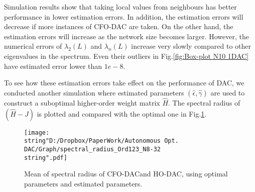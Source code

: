 \begin{figure*}
\hfill{}\hfill{}\hfill{}

\hfill{}\hfill{}\hfill{}

\caption{\label{fig:Box-plot N10 1DAC}Box plot of log mean estimation error
of eigenvalues, with/without local value of neighbors. Note that excluding
local values of neighbors will create more outliers as well as increase
the estimation error.}
\end{figure*}


Simulation results show that taking local values from neighbours has
better performance in lower estimation errors. In addition, the estimation
errors will decrease if more instances of CFO-DAC are taken. On the
other hand, the estimation errors  will increase as the network size
becomes larger. However, the numerical errors of $\lambda_{2}\left(L\right)$
and $\lambda_{n}\left(L\right)$ increase very slowly compared to
other eigenvalues in the spectrum. Even their outliers in Fig.\ref{fig:Box-plot N10 1DAC}
have estimated error lower than $1e-8$.

To see how these estimation errors take effect on the performance
of DAC, we conducted another simulation where estimated parameters
$\left(\hat{\epsilon},\hat{\gamma}\right)$  are used to construct
a suboptimal higher-order weight matrix $\hat{H}$. The spectral radius
of $\left(\hat{H}-J\right)$ is plotted and compared with the optimal
one in Fig.\ref{fig:Mean-of-spectral}. 

\begin{figure}
\hfill{}\texttt{[image: \\string"D:/Dropbox/PaperWork/Autonomous Opt. DAC/Graph/spectral\_radius\_Ord123\_N8-32\\string".pdf]}\hfill{}

\caption{\label{fig:Mean-of-spectral}Mean of spectral radius of CFO-DACand
HO-DAC, using optimal parameters and estimated parameters. }
\end{figure}


